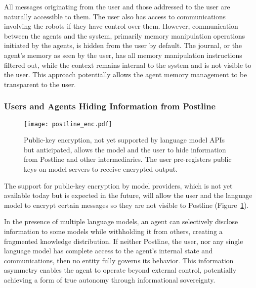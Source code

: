 All messages originating from the user and those addressed to the user are naturally accessible to them. The user also has access to communications involving the robots if they have control over them. However, communication between the agents and the system, primarily memory manipulation operations initiated by the agents, is hidden from the user by default. The journal, or the agent's memory as seen by the user, has all memory manipulation instructions filtered out, while the context remains internal to the system and is not visible to the user. This approach potentially allows the agent memory management to be transparent to the user.

\subsubsection*{Users and Agents Hiding Information from Postline}

\begin{figure}[h]
    \centering
    \texttt{[image: postline\_enc.pdf]}
    \caption{Public-key encryption, not yet supported by language model APIs but anticipated, allows the model and the user to hide information from Postline and other intermediaries. The user pre-registers public keys on model servers to receive encrypted output.}
    \label{fig:enc}
\end{figure}

The support for public-key encryption by model providers, which is not yet available today but is expected in the future, will allow the user and the language model to encrypt certain messages so they are not visible to Postline (Figure~\ref{fig:enc}).

In the presence of multiple language models, an agent can selectively disclose information to some models while withholding it from others, creating a fragmented knowledge distribution. If neither Postline, the user, nor any single language model has complete access to the agent’s internal state and communications, then no entity fully governs its behavior. This information asymmetry enables the agent to operate beyond external control, potentially achieving a form of true autonomy through informational sovereignty.
